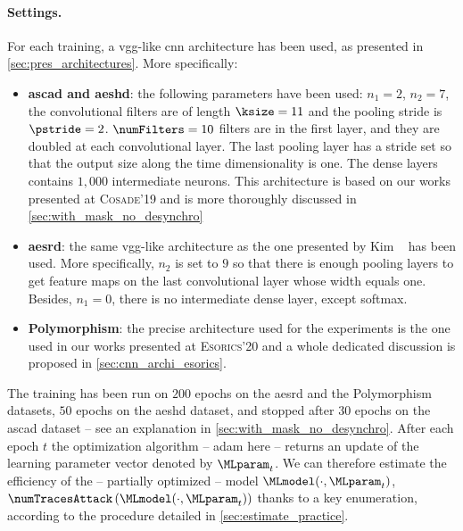 \paragraph{Settings.}
For each training, a \gls{vgg}-like \gls{cnn} architecture has been used, as presented in \autoref{sec:pres_architectures}.
More specifically:
\begin{itemize}
    \item \textbf{\gls{ascad} and \gls{aeshd}}:
    the following parameters have been used: \(n_1 = 2\), \(n_2 = 7\), the convolutional filters are of length \(\ksize=11\) and the pooling stride is \(\pstride=2\).
    \(\numFilters = 10\) filters are in the first layer, and they are doubled at each convolutional layer.
    The last pooling layer has a stride set so that the output size along the time dimensionality is one.
    The dense layers contains \(1,000\) intermediate neurons.
    This architecture is based on our works presented at \textsc{Cosade}'19 and is more thoroughly discussed in \autoref{sec:with_mask_no_desynchro}
    \item \textbf{\gls{aesrd}}: the same \gls{vgg}-like architecture as the one presented by Kim \etal{}~\cite{kim_make_2019} has been used.
    More specifically, \(n_2\) is set to \(9\) so that there is enough pooling layers to get feature maps on the last convolutional layer whose width equals one.
    Besides, \(n_1=0\), \ie{} there is no intermediate dense layer, except softmax.
    \item \textbf{Polymorphism}: the precise architecture used for the experiments is the one used in our works presented at \textsc{Esorics}'20 and a whole dedicated discussion is proposed in \autoref{sec:cnn_archi_esorics}.
\end{itemize}

The training has been run on \(200\) epochs on the \gls{aesrd} and the Polymorphism datasets, \(50\) epochs on the \gls{aeshd} dataset, and stopped after \(30\) epochs on the \gls{ascad} dataset -- see an explanation in \autoref{sec:with_mask_no_desynchro}.
After each epoch \(t\) the optimization algorithm -- \gls{adam} here -- returns an update of the learning parameter vector denoted by \(\MLparam_t\).
We can therefore estimate the efficiency of the -- partially optimized -- model \(\MLmodel(\cdot, \MLparam_t)\), \ie{} \(\numTracesAttack\left(\MLmodel(\cdot, \MLparam_t)\right)\) thanks to a key enumeration, according to the procedure detailed in \autoref{sec:estimate_practice}.

